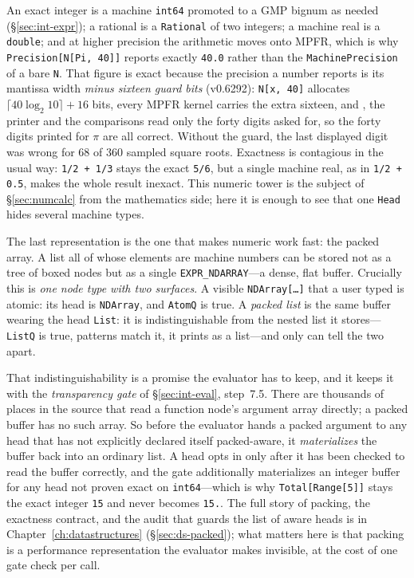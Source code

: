 
An exact integer is a machine \texttt{int64} promoted to a GMP bignum as needed
(\S\ref{sec:int-expr}); a rational is a \texttt{Rational} of two integers; a machine
real is a \texttt{double}; and at higher precision the arithmetic moves onto MPFR,
which is why \texttt{Precision[N[Pi, 40]]} reports exactly \texttt{40.0} rather than the
\texttt{MachinePrecision} of a bare \texttt{N}. That figure is exact because the
precision a number reports is its mantissa width \emph{minus sixteen guard bits}
(v0.6292): \texttt{N[x, 40]} allocates \(\lceil 40 \log_2 10\rceil + 16\) bits, every
MPFR kernel carries the extra sixteen, and , the printer and the
comparisons read only the forty digits asked for, so the forty digits printed for
\(\pi\) are all correct. Without the guard, the last
displayed digit was wrong for 68 of 360 sampled square roots. Exactness is contagious in the usual
way: \texttt{1/2 + 1/3} stays the exact \texttt{5/6}, but a single machine real, as in
\texttt{1/2 + 0.5}, makes the whole result inexact. This numeric tower is the subject
of \S\ref{sec:numcalc} from the mathematics side; here it is enough to see that one
\texttt{Head} hides several machine types.

The last representation is the one that makes numeric work fast: the packed array. A
list all of whose elements are machine numbers can be stored not as a tree of boxed
nodes but as a single \texttt{EXPR\_NDARRAY}---a dense, flat buffer. Crucially this is
\emph{one node type with two surfaces}. A visible \texttt{NDArray[\dots]} that a user
typed is atomic: its head is \texttt{NDArray}, and \texttt{AtomQ} is true. A
\emph{packed list} is the same buffer wearing the head \texttt{List}: it is
indistinguishable from the nested list it stores---\texttt{ListQ} is true, patterns
match it, it prints as a list---and only  can tell the two apart.


That indistinguishability is a promise the evaluator has to keep, and it keeps it with
the \emph{transparency gate} of \S\ref{sec:int-eval}, step~7.5. There are thousands of
places in the source that read a function node's argument array directly; a packed
buffer has no such array. So before the evaluator hands a packed argument to any head
that has not explicitly declared itself packed-aware, it \emph{materializes} the buffer
back into an ordinary list. A head opts in only after it has been checked to read the
buffer correctly, and the gate additionally materializes an integer buffer for any head
not proven exact on \texttt{int64}---which is why \texttt{Total[Range[5]]} stays the
exact integer \texttt{15} and never becomes \texttt{15.}. The full story of packing,
the exactness contract, and the audit that guards the list of aware heads is in
Chapter~\ref{ch:datastructures} (\S\ref{sec:ds-packed}); what matters here is that
packing is a performance representation the evaluator makes invisible, at the cost of
one gate check per call.

